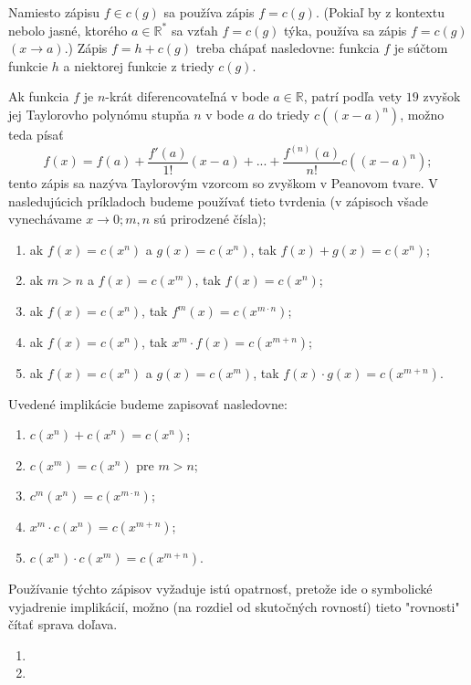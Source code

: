 Namiesto zápisu $f\in c(g)$ sa používa zápis $f=c(g)$. (Pokiaľ by z kontextu nebolo jasné, ktorého $a\in\mathbb{R^*}$ sa vzťah $f=c(g)$ týka, používa sa zápis $f=c(g)$ $(x\rightarrow a).$) Zápis $f=h+c(g)$ treba chápať nasledovne: funkcia $f$ je súčtom funkcie $h$ a niektorej funkcie z triedy $c(g)$. 

Ak funkcia $f$ je $n$-krát diferencovateľná v bode $a\in\mathbb{R}$, patrí podľa vety $19$ zvyšok jej Taylorovho polynómu stupňa $n$ v bode $a$ do triedy $c((x-a)^n)$, možno teda písať 
$$f(x)=f(a)+\frac{f'(a)}{1!}(x-a)+...+\frac{f^{(n)}(a)}{n!}c((x-a)^n);$$
tento zápis sa nazýva Taylorovým vzorcom so zvyškom v Peanovom tvare.
V nasledujúcich príkladoch budeme používať tieto tvrdenia (v zápisoch všade vynechávame $x\rightarrow 0;m,n$ sú prirodzené čísla);
\begin{enumerate}
\item ak $f(x)=c(x^n)$ a $g(x)=c(x^n)$, tak $f(x)+g(x)=c(x^n)$;
\item ak $m>n$ a $f(x)=c(x^m)$, tak $f(x)=c(x^n)$;
\item ak $f(x)=c(x^n)$, tak $f^m(x)=c(x^{m\cdot n})$;
\item ak $f(x)=c(x^n)$, tak $x^m\cdot f(x)=c(x^{m+n})$;
\item ak $f(x)=c(x^n)$ a $g(x)=c(x^m)$, tak $f(x)\cdot g(x)=c(x^{m+n})$.
\end{enumerate}

Uvedené implikácie budeme zapisovať nasledovne:
\begin{enumerate}
\item $c(x^n)+c(x^n)=c(x^n)$;
\item $c(x^m)=c(x^n)$ pre $m>n$;
\item $c^m(x^n)=c(x^{m\cdot n})$;
\item $x^m\cdot c(x^n)=c(x^{m+n})$;
\item $c(x^n)\cdot c(x^m)=c(x^{m+n})$.
\end{enumerate}

Používanie týchto zápisov vyžaduje istú opatrnosť, pretože ide o symbolické vyjadrenie implikácií, možno (na rozdiel od skutočných rovností) tieto "rovnosti" čítať sprava doľava.

\begin{enumerate}[resume]
	\item {}
	\item {}
\end{enumerate}